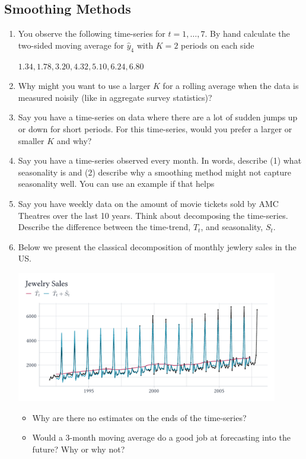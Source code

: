 \documentclass[12pt]{article}
\begin{document}
\subsection*{Smoothing Methods}
\begin{enumerate}
  \item You observe the following time-series for $t = 1, \dots, 7$. By hand calculate the two-sided moving average for $\hat{y}_4$ with $K = 2$ periods on each side
  
  $1.34, 1.78, 3.20, 4.32, 5.10, 6.24, 6.80$

  \item Why might you want to use a larger $K$ for a rolling average when the data is measured noisily (like in aggregate survey statistics)?
  
  \item Say you have a time-series on data where there are a lot of sudden jumps up or down for short periods. For this time-series, would you prefer a larger or smaller $K$ and why?
  
  \item Say you have a time-series observed every month. In words, describe (1) what seasonality is and (2) describe why a smoothing method might not capture seasonality well. You can use an example if that helps
  
  \item Say you have weekly data on the amount of movie tickets sold by AMC Theatres over the last 10 years. Think about decomposing the time-series. Describe the difference between the time-trend, $T_t$, and seasonality, $S_t$. 
  
  \item Below we present the classical decomposition of monthly jewlery sales in the US.
  \begin{center}
    \includegraphics[width = 0.9\textwidth]{figures/jewelry_decomposition.pdf}
  \end{center}
  \begin{itemize}
    \item Why are there no estimates on the ends of the time-series?
    
    \item Would a 3-month moving average do a good job at forecasting into the future? Why or why not?
  \end{itemize}
\end{enumerate}
\end{document}
